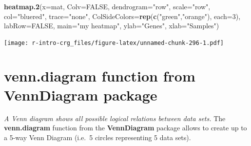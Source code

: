 \documentclass[]{book}
\newenvironment{Shaded}{\begin{snugshade}}{\end{snugshade}}
\newcommand{\DataTypeTok}[1]{\textcolor[rgb]{0.13,0.29,0.53}{#1}}
\newcommand{\DecValTok}[1]{\textcolor[rgb]{0.00,0.00,0.81}{#1}}
\newcommand{\KeywordTok}[1]{\textcolor[rgb]{0.13,0.29,0.53}{\textbf{#1}}}
\newcommand{\NormalTok}[1]{#1}
\newcommand{\OtherTok}[1]{\textcolor[rgb]{0.56,0.35,0.01}{#1}}
\newcommand{\StringTok}[1]{\textcolor[rgb]{0.31,0.60,0.02}{#1}}
\begin{document}
\begin{Shaded}
\begin{Highlighting}[]
\KeywordTok{heatmap.2}\NormalTok{(}\DataTypeTok{x=}\NormalTok{mat, }
    \DataTypeTok{Colv=}\OtherTok{FALSE}\NormalTok{, }
    \DataTypeTok{dendrogram=}\StringTok{"row"}\NormalTok{,}
    \DataTypeTok{scale=}\StringTok{"row"}\NormalTok{,}
    \DataTypeTok{col=}\StringTok{"bluered"}\NormalTok{,}
    \DataTypeTok{trace=}\StringTok{"none"}\NormalTok{,}
    \DataTypeTok{ColSideColors=}\KeywordTok{rep}\NormalTok{(}\KeywordTok{c}\NormalTok{(}\StringTok{"green"}\NormalTok{,}\StringTok{"orange"}\NormalTok{), }\DataTypeTok{each=}\DecValTok{3}\NormalTok{),}
    \DataTypeTok{labRow=}\OtherTok{FALSE}\NormalTok{,}
    \DataTypeTok{main=}\StringTok{"my heatmap"}\NormalTok{,}
    \DataTypeTok{ylab=}\StringTok{"Genes"}\NormalTok{,}
    \DataTypeTok{xlab=}\StringTok{"Samples"}\NormalTok{)}
\end{Highlighting}
\end{Shaded}

\texttt{[image: r-intro-crg\_files/figure-latex/unnamed-chunk-296-1.pdf]}

\hypertarget{venn.diagram-function-from-venndiagram-package}{%
\section{venn.diagram function from VennDiagram package}\label{venn.diagram-function-from-venndiagram-package}}

\emph{A Venn diagram shows all possible logical relations between data sets.}
The \textbf{venn.diagram} function from the \textbf{VennDiagram} package allows to create up to a 5-way Venn Diagram (i.e.~5 circles representing 5 data sets).
\end{document}
